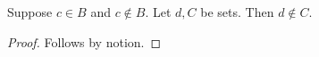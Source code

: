 

\begin{proposition}\label{horn_negative_no_explosion}
    Suppose $c\in B$ and $c\notin B$.
    Let $d,C$ be sets.
    Then $d\notin C$.
\end{proposition}
\begin{proof}
    Follows by notion.
\end{proof}
